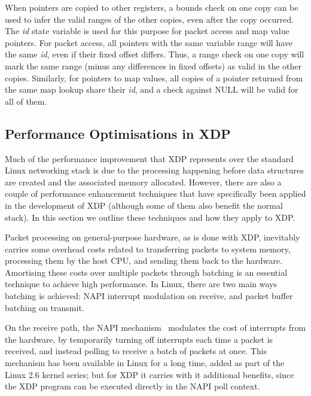 \documentclass[10pt,sigconf]{acmart}
\begin{document}
When pointers are copied to other registers, a bounds check on one copy can be
used to infer the valid ranges of the other copies, even after the copy
occurred. The \emph{id} state variable is used for this purpose for packet access and
map value pointers. For packet access, all pointers with the same variable
range will have the same \emph{id}, even if their fixed offset differs. Thus, a range
check on one copy will mark the same range (minus any differences in fixed
offsets) as valid in the other copies. Similarly, for pointers to map values,
all copies of a pointer returned from the same map lookup share their \emph{id}, and
a check against NULL will be valid for all of them.



\subsection{Performance Optimisations in XDP}
\label{sec:perf-optim-xdp}

Much of the performance improvement that XDP represents over the standard Linux
networking stack is due to the processing happening before data structures are
created and the associated memory allocated. However, there are also a couple of
performance enhancement techniques that have specifically been applied in the
development of XDP (although some of them also benefit the normal stack). In
this section we outline these techniques and how they apply to XDP.

Packet processing on general-purpose hardware, as is done with XDP, inevitably
carries some overhead costs related to transferring packets to system memory,
processing them by the host CPU, and sending them back to the hardware.
Amortising these costs over multiple packets through batching is an essential
technique to achieve high performance. In Linux, there are two main ways
batching is achieved: NAPI interrupt modulation on receive, and packet buffer
batching on transmit.

On the receive path, the NAPI mechanism~\cite{napi} modulates the cost of
interrupts from the hardware, by temporarily turning off interrupts each time a
packet is received, and instead polling to receive a batch of packets at once.
This mechanism has been available in Linux for a long time, added as part of the
Linux 2.6 kernel series; but for XDP it carries with it additional benefits,
since the XDP program can be executed directly in the NAPI poll context.
\end{document}

